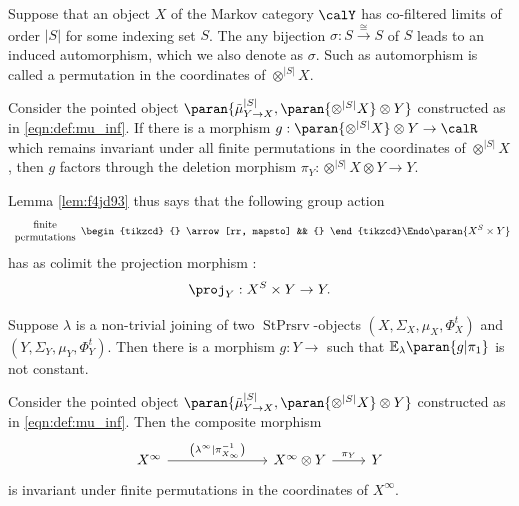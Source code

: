 \documentclass[12pt,oneside,pb-diagram]{article}
\DeclareMathOperator{\sps}{StPrsrv}
\begin{document}
\begin{definition} [Permutations]
	Suppose that an object $X$ of the Markov category $\calY$ has co-filtered limits of order $|S|$ for some indexing set $S$. The any bijection $\sigma : S \xrightarrow{\cong} S$ of $S$ leads to an induced automorphism, which we also denote as $\sigma$. Such as automorphism is called a permutation in the coordinates of $\otimes^{|S|} X$.
\end{definition}

\begin{lemma}  \label{lem:f4jd93}
	\cite[Lem 9]{LemanczykEtAl1993gaussian} Consider the pointed object $\paran{ \tilde{\mu}_{Y\to X}^{|S|}, \paran{\otimes^{|S|} X} \otimes Y }$ constructed as in \eqref{eqn:def:mu_inf}. If there is a morphism $g : \paran{\otimes^{|S|} X} \otimes Y \to \calR$ which remains invariant under all finite permutations in the coordinates of $\otimes^{|S|} X$, then $g$ factors through the deletion morphism $\pi_Y : \otimes^{|S|} X \otimes Y \to Y$.
\end{lemma}

Lemma \ref{lem:f4jd93} thus says that the following group action
\[ \begin{array}{cc}
	\mbox{finite}  \\
	\mbox{permutations}
\end{array} 
\begin{tikzcd}
	{} \arrow[rr, mapsto] && {}
\end{tikzcd}
\Endo \paran{ X^S \times Y }\]
has as colimit the projection morphism :
%
\[ \proj_Y : X^S \times Y \to Y. \]
%

\begin{lemma} \label{lem:lix02}
	Suppose $\lambda$ is a non-trivial joining of two $\sps$-objects $(X, \Sigma_X, \mu_X, \Phi_X^t)$ and $(Y, \Sigma_Y, \mu_Y, \Phi_Y^t)$. Then there is a morphism $g : Y\to $ such that $\mathbb{E}_{\lambda} \paran{ g | \pi_1}$ is not constant. 
\end{lemma}

\begin{lemma} \label{lem:Thm4:b}
	\cite[Thm 4]{LemanczykEtAl1993gaussian} Consider the pointed object $\paran{ \tilde{\mu}_{Y\to X}^{|S|}, \paran{\otimes^{|S|} X} \otimes Y }$ constructed as in \eqref{eqn:def:mu_inf}. Then the composite morphism
	\[\begin{tikzcd}
		X^\infty \arrow[rrr, "\left( \lambda^{\infty} | \pi_{X_{\infty}}^{-1} \right)"] &&& X^\infty \otimes Y \arrow[r, "\pi_Y"] & Y
	\end{tikzcd}\]
	is invariant under finite permutations in the coordinates of $X^\infty$.
\end{lemma} 
\end{document}

